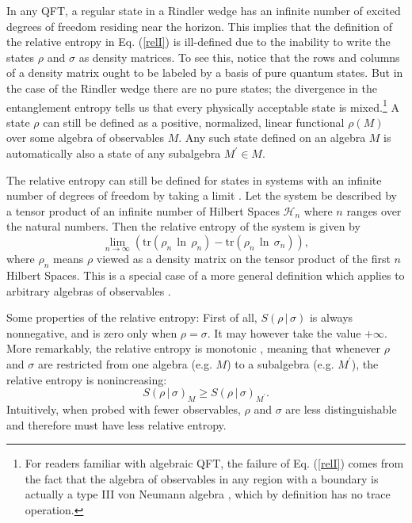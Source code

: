 \documentclass{article}
\begin{document}
In any QFT, a regular state in a Rindler wedge has an infinite number of excited degrees of freedom residing near the horizon.  This implies that the definition of the relative entropy in Eq. (\ref{relI}) is ill-defined due to the inability to write the states $\rho$ and $\sigma$ as density matrices.  To see this, notice that the rows and columns of a density matrix ought to be labeled by a basis of pure quantum states.  But in the case of the Rindler wedge there are no pure states; the divergence in the entanglement entropy tells us that every physically acceptable state is mixed.\footnote{For readers familiar with algebraic QFT, the failure of Eq. (\ref{relI}) comes from the fact that the algebra of observables in any region with a boundary is actually a type III von Neumann algebra \cite{BAF87}, which by definition has no trace operation.}  A state $\rho$ can still be defined as a positive, normalized, linear functional 
$\rho(M)$ over some algebra of observables $M$.  Any such state defined on an algebra $M$ is automatically also a state of any subalgebra $M^\prime \in M$.

The relative entropy can still be defined for states in systems with an infinite number of degrees of freedom by taking a limit \cite{araki75}.  Let the system be described by a tensor product of an infinite number of Hilbert Spaces $\mathcal{H}_n$ where $n$ ranges over the natural numbers.  Then the relative entropy of the system is given by
\begin{equation}
\lim_{n \to \infty} (\mathrm{tr}(\rho_n\,\ln\,\rho_n) - \mathrm{tr}(\rho_n\,\ln\,\sigma_n)),
\end{equation}
where $\rho_n$ means $\rho$ viewed as a density matrix on the tensor product of the first $n$ Hilbert Spaces.  This is a special case of a more general definition which applies to arbitrary algebras of observables \cite{araki75}.

Some properties of the relative entropy: First of all, $S(\rho\,|\,\sigma)$ is always nonnegative, and is zero only when $\rho = \sigma$.  It may however take the value $+\infty$.  
More remarkably, the relative entropy is monotonic \cite{lindblad75}, meaning that whenever $\rho$ and $\sigma$ are restricted from one algebra (e.g. $M$) to a subalgebra (e.g. $M^{\prime}$), the relative entropy is nonincreasing:
\begin{equation}\label{mono}
S(\rho\,|\,\sigma)_M \ge S(\rho\,|\,\sigma)_{M^{\prime}}.
\end{equation}
Intuitively, when probed with fewer observables, $\rho$ and $\sigma$ are less distinguishable and therefore must have less relative entropy.  
\end{document}
